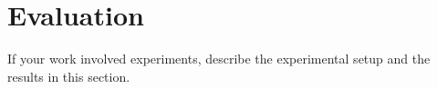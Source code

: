 \documentclass[../report.tex]{subfiles}
\begin{document}
    \section{Evaluation}
    \label{sec:evaluation}

    If your work involved experiments, describe the experimental setup and the results in this section.
\end{document}
